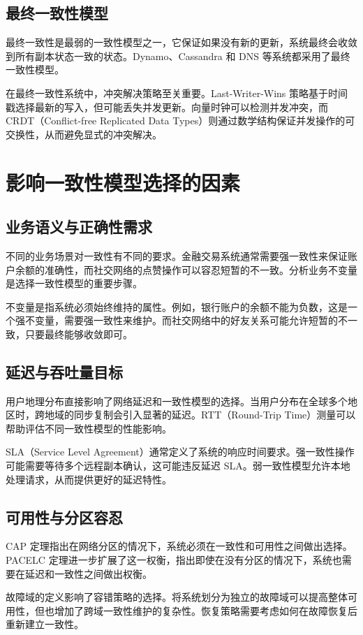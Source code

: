 \section{最终一致性模型}
最终一致性是最弱的一致性模型之一，它保证如果没有新的更新，系统最终会收敛到所有副本状态一致的状态。Dynamo、Cassandra 和 DNS 等系统都采用了最终一致性模型。\par
在最终一致性系统中，冲突解决策略至关重要。Last-Writer-Wins 策略基于时间戳选择最新的写入，但可能丢失并发更新。向量时钟可以检测并发冲突，而 CRDT（Conflict-free Replicated Data Types）则通过数学结构保证并发操作的可交换性，从而避免显式的冲突解决。\par
\chapter{影响一致性模型选择的因素}
\section{业务语义与正确性需求}
不同的业务场景对一致性有不同的要求。金融交易系统通常需要强一致性来保证账户余额的准确性，而社交网络的点赞操作可以容忍短暂的不一致。分析业务不变量是选择一致性模型的重要步骤。\par
不变量是指系统必须始终维持的属性。例如，银行账户的余额不能为负数，这是一个强不变量，需要强一致性来维护。而社交网络中的好友关系可能允许短暂的不一致，只要最终能够收敛即可。\par
\section{延迟与吞吐量目标}
用户地理分布直接影响了网络延迟和一致性模型的选择。当用户分布在全球多个地区时，跨地域的同步复制会引入显著的延迟。RTT（Round-Trip Time）测量可以帮助评估不同一致性模型的性能影响。\par
SLA（Service Level Agreement）通常定义了系统的响应时间要求。强一致性操作可能需要等待多个远程副本确认，这可能违反延迟 SLA。弱一致性模型允许本地处理请求，从而提供更好的延迟特性。\par
\section{可用性与分区容忍}
CAP 定理指出在网络分区的情况下，系统必须在一致性和可用性之间做出选择。PACELC 定理进一步扩展了这一权衡，指出即使在没有分区的情况下，系统也需要在延迟和一致性之间做出权衡。\par
故障域的定义影响了容错策略的选择。将系统划分为独立的故障域可以提高整体可用性，但也增加了跨域一致性维护的复杂性。恢复策略需要考虑如何在故障恢复后重新建立一致性。\par
